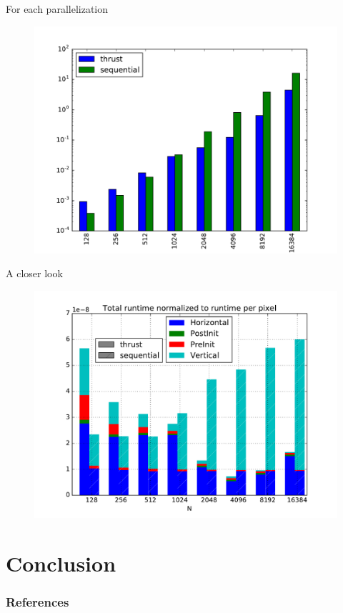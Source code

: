 \documentclass{beamer}
\begin{document}
\begin{frame}{For each parallelization}
  \begin{figure}
    \includegraphics[scale=0.4]{imgs/thrust_vs_sequential_total.pdf} 
  \end{figure}
\end{frame} 

\begin{frame}{A closer look}
  \begin{figure}
    \includegraphics[scale=0.4]{imgs/thrust_vs_sequential_normalized.pdf} 
  \end{figure}
\end{frame} 


\section{Conclusion} 

\begin{frame}[t]
  \frametitle{References}
  
  
\end{frame}
\end{document}

